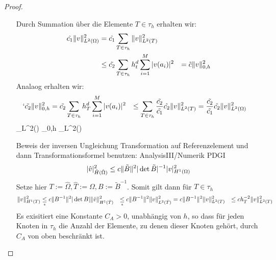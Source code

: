 \begin{proof}
\begin{enumerate}
    Durch Summation über die Elemente $T\in \tau_h$ erhalten wir:
    \begin{align*}
      \hat{c_1} \|v\|_{L^2(\Omega)}^2 &= \hat{c_1} \sum_{T\in \tau_h} \|v\|_{L^2(T)}^2 \\
                                         &\leq \tilde{c_2} \sum_{T\in\tau_h} h_t^d \sum_{i=1}^{M} |v(a_i)|^2
                                         &= \tilde{c} \|v\|^2_{0,h}
    \end{align*}
    Analaog erhalten wir:
    \begin{align*}`
      \tilde{c_2}\|v\|_{0,h}^2 &= \tilde{c_2} \sum_{T\in\tau_h} h_T^d \sum_{i=1}^{M} |v(a_i)|^2
      &\leq \sum_{T\in\tau_h} \frac{\tilde{c_2}}{\tilde{c_1}} \hat{c_2} \|v\|_{L^2(T)}^2
      &= \frac{\tilde{c_2}}{\tilde{c_1}} \hat{c_2} \|v\|^2_{L^2(\Omega)}
    \end{align*}
    \Rightarrow {} _{L^2(\Omega)} \leq {}_{0,h} \leq {}_{L^2(\Omega)}
  \item[Beweis der inversen Ungleichung]
    Transformation auf Referenzelement und dann Transformationsformel benutzen: AnalysisIII/Numerik PDGI
    \begin{equation*}
      |\hat{v}|^2_{\hat{H}(\hat{\Omega})} \leq c \|\tilde{B}\|^2 |\det \tilde{B}|^{-1} |v|^2_{H^1(\Omega)}
    \end{equation*}
    Setze hier $T:=\hat{\Omega}, \hat{T}:=\Omega, B:=\tilde{B}^{-1}$. Somit gilt dann für $T\in\tau_h$
    \begin{align}
      \|v\|^2_{H^1(T)} &\underset{*}{\leq} c\|B^{-1}\|^2 |\det B| \|\hat{v}\|^2_{H^1(\hat{T})}
      &\underset{*}{\leq} c\|B^{-1}\|^2 \|v\|^2_{L^2(\hat{T})}
      &= c\|B^{-1}\|^2 \|v\|^2_{L^2(T)}
      &\leq c h^{-2}_T \|v\|^2_{L^2(T)}
      \label{}
    \end{align}
    Es exisitiert eine Konstante $C_A>0$, unabhängig von $h$, so dass für jeden Knoten in $\tau_h$ die Anzahl der Elemente, zu denen dieser Knoten gehört, durch $C_A$ von oben beschränkt ist. 
  \end{enumerate}
\end{proof}
